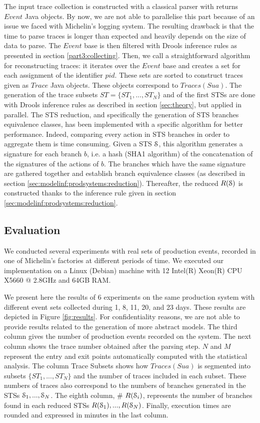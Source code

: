 The input trace collection is constructed with a classical parser
with returns $Event$ Java objects. By now, we are not able to
parallelise this part because of an issue we faced with
Michelin's logging system. The resulting drawback is that the
time to parse traces is longer than expected and heavily depends
on the size of data to parse. The $Event$ base is then filtered
with Drools inference rules as presented in section
\ref{part3:collecting}.  Then, we call a straightforward
algorithm for reconstructing traces: it iterates over the $Event$
base and creates a set for each assignment of the identifier
$pid$. These sets are sorted to construct traces given as $Trace$
Java objects. These objects correspond to $Traces(Sua)$. The
generation of the trace subsets $ST= \{ST_1,...,ST_N\}$ and of
the first STSs are done with Drools inference rules as described
in section \ref{sec:theory}, but applied in parallel. The STS
reduction, and specifically the generation of STS branches
equivalence classes, has been implemented with a specific
algorithm for better performance. Indeed, comparing every action
in STS branches in order to aggregate them is time consuming.
Given a STS $\EuScript{S}$, this algorithm generates a signature
for each branch $b$, i.e. a hash (SHA1 algorithm) of the
concatenation of the signatures of the actions of $b$. The
branches which have the same signature are gathered together and
establish branch equivalence classes (as described in section
\ref{sec:modelinf:prodsystems:reduction}). Thereafter, the reduced $R(\EuScript{S})$
is constructed thanks to the inference rule given in section
\ref{sec:modelinf:prodsystems:reduction}.

\subsection{Evaluation}

We conducted several experiments with real sets of production
events, recorded in one of Michelin's factories at different
periods of time. We executed our implementation on a Linux
(Debian) machine with 12 Intel(R) Xeon(R) CPU X5660 @ 2.8GHz and
64GB RAM.

We present here the results of 6 experiments on the same
production system with different event sets collected during 1,
8, 11, 20, and 23 days. These results are depicted in Figure
\ref{fig:results}. For confidentiality reasons, we are not able
to provide results related to the generation of more abstract
models. The third column gives the number of production events
recorded on the system. The next column shows the trace number
obtained after the parsing step.  $N$ and $M$ represent the entry
and exit points automatically computed with the statistical
analysis. The column Trace Subsets shows how $Traces(Sua)$ is
segmented into subsets $\{ST_1,...,ST_N\}$ and the number of
traces included in each subset. These numbers of traces also
correspond to the numbers of branches generated in the STSs
$\EuScript{S}_1,...,\EuScript{S}_N$. The eighth column, \#
$R(\EuScript{S}_i)$, represents the number of branches found in
each reduced STSs $R(\EuScript{S}_1),...,R(\EuScript{S}_N)$.
Finally, execution times are rounded and expressed in minutes in
the last column.

